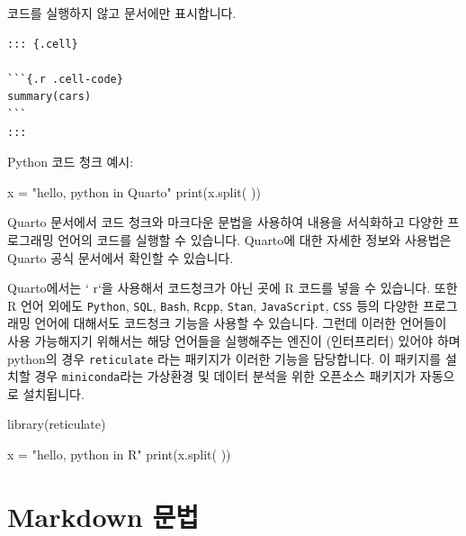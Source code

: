 \documentclass[
  a4paper,
]{book}
\newenvironment{Shaded}{\begin{snugshade}}{\end{snugshade}}
\newcommand{\BuiltInTok}[1]{\textcolor[rgb]{0.00,0.23,0.31}{#1}}
\newcommand{\FunctionTok}[1]{\textcolor[rgb]{0.28,0.35,0.67}{#1}}
\newcommand{\NormalTok}[1]{\textcolor[rgb]{0.00,0.23,0.31}{#1}}
\newcommand{\OperatorTok}[1]{\textcolor[rgb]{0.37,0.37,0.37}{#1}}
\newcommand{\StringTok}[1]{\textcolor[rgb]{0.13,0.47,0.30}{#1}}
\begin{document}
코드를 실행하지 않고 문서에만 표시합니다.

\begin{verbatim}
::: {.cell}

```{.r .cell-code}
summary(cars)
```
:::
\end{verbatim}

Python 코드 청크 예시:

\begin{Shaded}
\begin{Highlighting}[]
\NormalTok{x }\OperatorTok{=} \StringTok{"hello, python in Quarto"}
\BuiltInTok{print}\NormalTok{(x.split(}\StringTok{\textquotesingle{} \textquotesingle{}}\NormalTok{))}
\end{Highlighting}
\end{Shaded}

Quarto 문서에서 코드 청크와 마크다운 문법을 사용하여 내용을 서식화하고
다양한 프로그래밍 언어의 코드를 실행할 수 있습니다. Quarto에 대한 자세한
정보와 사용법은 Quarto 공식 문서에서 확인할 수 있습니다.

Quarto에서는 ` r`을 사용해서 코드청크가 아닌 곳에 R 코드를 넣을 수
있습니다. 또한 R 언어 외에도 \texttt{Python}, \texttt{SQL},
\texttt{Bash}, \texttt{Rcpp}, \texttt{Stan}, \texttt{JavaScript},
\texttt{CSS} 등의 다양한 프로그래밍 언어에 대해서도 코드청크 기능을
사용할 수 있습니다. 그런데 이러한 언어들이 사용 가능해지기 위해서는 해당
언어들을 실행해주는 엔진이 (인터프리터) 있어야 하며 python의 경우
\texttt{reticulate} 라는 패키지가 이러한 기능을 담당합니다. 이 패키지를
설치할 경우 \texttt{miniconda}라는 가상환경 및 데이터 분석을 위한
오픈소스 패키지가 자동으로 설치됩니다.

\begin{Shaded}
\begin{Highlighting}[]
\FunctionTok{library}\NormalTok{(reticulate)}
\end{Highlighting}
\end{Shaded}

\begin{Shaded}
\begin{Highlighting}[]
\NormalTok{x }\OperatorTok{=} \StringTok{"hello, python in R"}
\BuiltInTok{print}\NormalTok{(x.split(}\StringTok{\textquotesingle{} \textquotesingle{}}\NormalTok{))}
\end{Highlighting}
\end{Shaded}

\hypertarget{markdown-uxbb38uxbc95-1}{%
\section{Markdown 문법}\label{markdown-uxbb38uxbc95-1}}
\end{document}
